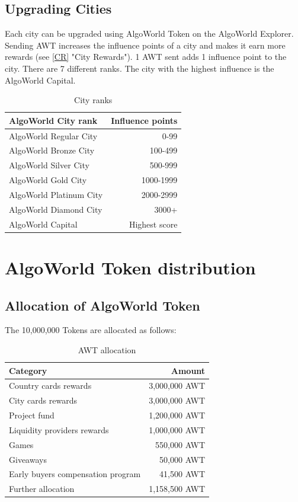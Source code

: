 \documentclass{article}
\begin{document}
\subsection{Upgrading Cities}
Each city can be upgraded using AlgoWorld Token on the AlgoWorld Explorer.
Sending AWT increases the influence points of a city and makes it earn more rewards (see \ref{CR} "City Rewards").
1 AWT sent adds 1 influence point to the city. 
There are 7 different ranks. The city with the highest influence is the AlgoWorld Capital. 

\begin{table}[ht]
\centering
\begin{tabular}{l|r}
AlgoWorld City rank & Influence points \\\hline
AlgoWorld Regular City & 0-99 \\
AlgoWorld Bronze City & 100-499 \\
AlgoWorld Silver City & 500-999 \\
AlgoWorld Gold City & 1000-1999 \\
AlgoWorld Platinum City & 2000-2999 \\
AlgoWorld Diamond City & 3000+ \\
AlgoWorld Capital & Highest score \\
\end{tabular}
\caption{\label{tab:widgets}City ranks}
\end{table}

\newpage
\section{AlgoWorld Token distribution}
\subsection{Allocation of AlgoWorld Token}
The 10,000,000 Tokens are allocated as follows:
\begin{table}[ht]
\centering
\begin{tabular}{l|r}
Category & Amount \\\hline
Country cards rewards & 3,000,000 AWT \\
City cards rewards & 3,000,000 AWT\\
Project fund & 1,200,000 AWT\\
Liquidity providers rewards & 1,000,000 AWT\\
Games & 550,000 AWT\\
Giveaways & 50,000 AWT\\
Early buyers compensation program & 41,500 AWT\\
Further allocation & 1,158,500 AWT
\end{tabular}
\caption{\label{tab:widgets}AWT allocation}
\end{table}
\end{document}
